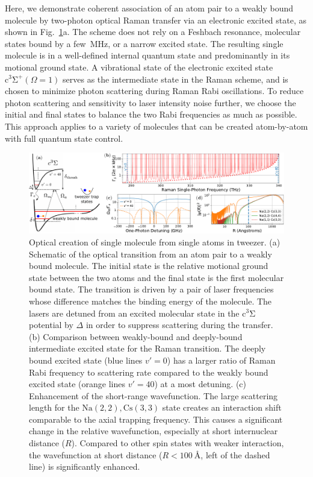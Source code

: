 \documentclass[aps,prl,twocolumn,10pt,superscriptaddress]{revtex4-1}
\newcommand{\Na}{\mathrm{Na}}
\newcommand{\Cs}{\mathrm{Cs}}
\begin{document}
Here, we demonstrate coherent association of an atom pair to a weakly bound molecule
by two-photon optical Raman transfer via an electronic excited state,
as shown in Fig.~\ref{f-theory}a.
The scheme does not rely on a Feshbach resonance,
molecular states bound by a few~MHz, or a narrow excited state.
The resulting single molecule is in a well-defined internal quantum state
and predominantly in its motional ground state.
A vibrational state of the electronic excited state $\mathrm{c^3\Sigma^+}(\Omega = 1)$
serves as the intermediate state in the Raman scheme,
and is chosen to minimize photon scattering during Raman Rabi oscillations.
To reduce photon scattering and sensitivity to laser intensity noise further,
we choose the initial and final states to balance the two Rabi frequencies as much as possible.
This approach applies to a variety of molecules that can be created atom-by-atom with full quantum state control.


\begin{figure}
  \includegraphics[width=\textwidth]{imgs/fig-theory.pdf}
  \caption{Optical creation of single molecule from single atoms in tweezer.
    (a) Schematic of the optical transition from an atom pair to a weakly bound molecule.
    The initial state is the relative motional ground state between the two atoms
    and the final state is the first molecular bound state.
    The transition is driven by a pair of laser frequencies whose difference matches the binding energy
    of the molecule.
    The lasers are detuned from an excited molecular state in the $\mathrm{c^3\Sigma}$ potential
    by $\Delta$ in order to suppress scattering during the transfer.
    (b) Comparison between weakly-bound and deeply-bound intermediate excited state
    for the Raman transition.
    The deeply bound excited state (blue lines $v'=0$)
    has a larger ratio of Raman Rabi frequency to scattering rate
    compared to the weakly bound excited state (orange lines $v'=40$) at a most detuning.
    (c) Enhancement of the short-range wavefunction.
    The large scattering length for the $\Na(2,2),\Cs(3,3)$ state creates an interaction shift
    comparable to the axial trapping frequency.
    This causes a significant change in the relative wavefunction, especially at short
    internuclear distance ($R$).
    Compared to other spin states with weaker interaction,
    the wavefunction at short distance ($R<100\ \text{\AA}$, left of the dashed line)
    is significantly enhanced.
    \label{f-theory}
  }
\end{figure}
\end{document}
